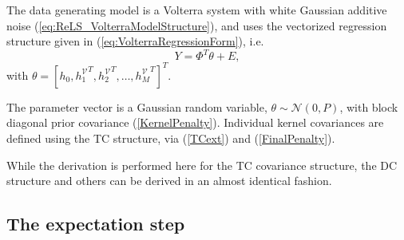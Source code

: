 \begin{assum}
The data generating model is a Volterra system with white Gaussian additive noise (\ref{eq:ReLS_VolterraModelStructure}), and uses the vectorized regression structure given in (\ref{eq:VolterraRegressionForm}), i.e.
\begin{equation}
\label{eq:VolterraRegressionForm_Chap4}
Y = \Phi^T \theta + E,
\end{equation}
with $\theta = [h_0, {h_1^\mathcal{V}}^T, {h_2^\mathcal{V}}^T, \hdots, {h_M^\mathcal{V}}^T]^T$.
\label{ass:ModelStructure_Chap4}
\end{assum}

\begin{assum}
The parameter vector is a Gaussian random variable, $\theta \sim \mathcal{N}(0,P)$, with block diagonal prior covariance (\ref{KernelPenalty}). Individual kernel covariances are defined using the TC structure, via (\ref{TCext}) and (\ref{FinalPenalty}).
\label{ass:GaussianTheta_Chap4}
\end{assum}

While the derivation is performed here for the TC covariance structure, the DC structure and others can be derived in an almost identical fashion.

\subsection{The expectation step}

